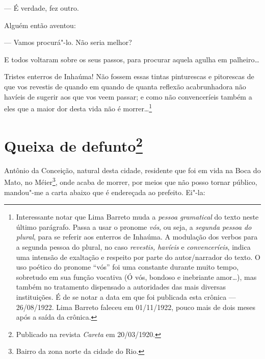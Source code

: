 --- É verdade, fez outro.

Alguém então aventou:

--- Vamos procurá"-lo. Não seria melhor?

E todos voltaram sobre os seus passos, para procurar aquela agulha em
palheiro\ldots{}

Tristes enterros de Inhaúma! Não fossem essas tintas pinturescas e
pitorescas de que vos revestis de quando em quando de quanta reflexão
acabrunhadora não havíeis de sugerir aos que vos veem passar; e como não
convenceríeis também a eles que a maior dor desta vida não é
morrer\ldots{}\footnote{Interessante notar que Lima Barreto muda a
  \emph{pessoa gramatical} do texto neste último parágrafo. Passa a usar
  o pronome \emph{vós}, ou seja, a \emph{segunda pessoa do plural}, para
  se referir aos enterros de Inhaúma. A modulação dos verbos para a
  segunda pessoa do plural, no caso \emph{revestis, havíeis} e
  \emph{convenceríeis}, indica uma intensão de exaltação e respeito por
  parte do autor/narrador do texto. O uso poético do pronome ``vós'' foi
  uma constante durante muito tempo, sobretudo em sua função vocativa (Ó
  vós, bondoso e inebriante amor\ldots{}), mas também no tratamento
  dispensado a autoridades das mais diversas instituições. É de se notar
  a data em que foi publicada esta crônica --- 26/08/1922. Lima Barreto
  faleceu em 01/11/1922, pouco mais de dois meses após a saída da
  crônica.}



\chapter[Queixa de defunto]{Queixa de defunto\footnote[*]{Publicado na revista \emph{Careta} em 20/03/1920.}}

Antônio da Conceição, natural desta cidade, residente que foi em vida na
Boca do Mato, no Méier\footnote{Bairro da zona norte da cidade do Rio.},
onde acaba de morrer, por meios que não posso tornar público, mandou"-me
a carta abaixo que é endereçada ao prefeito. Ei"-la:

